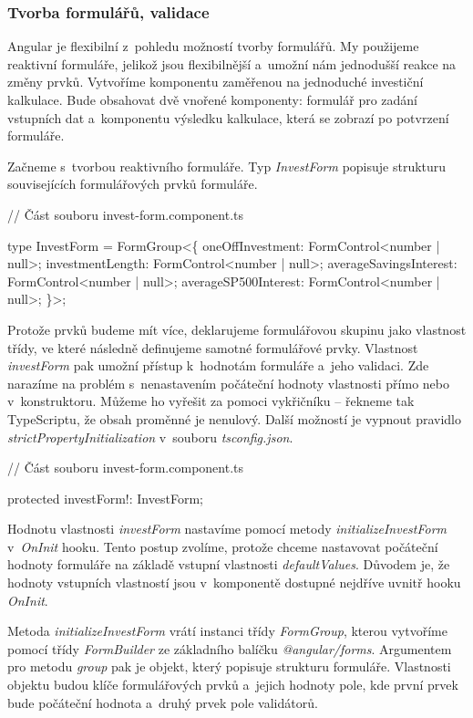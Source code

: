 \subsubsection*{Tvorba formulářů, validace}

Angular je flexibilní z~pohledu možností tvorby formulářů. My použijeme reaktivní formuláře, jelikož jsou flexibilnější a~umožní nám jednodušší reakce na změny prvků.
Vytvoříme komponentu zaměřenou na jednoduché investiční kalkulace. 
Bude obsahovat dvě vnořené komponenty: formulář pro zadání vstupních dat a~komponentu výsledku kalkulace, která se zobrazí po potvrzení formuláře.

Začneme s~tvorbou reaktivního formuláře. Typ \emph{InvestForm} popisuje strukturu souvisejících formulářových prvků formuláře.

\begin{prog}
// Část souboru invest-form.component.ts

type InvestForm = FormGroup<\{
  oneOffInvestment: FormControl<number | null>;
  investmentLength: FormControl<number | null>;
  averageSavingsInterest: FormControl<number | null>;
  averageSP500Interest: FormControl<number | null>;
\}>;
\end{prog}

Protože prvků budeme mít více, deklarujeme formulářovou skupinu jako vlastnost třídy, ve které následně definujeme samotné formulářové prvky. 
Vlastnost \emph{investForm} pak umožní přístup k~hodnotám formuláře a~jeho validaci. Zde narazíme na problém s~nenastavením počáteční hodnoty vlastnosti přímo nebo v~konstruktoru. 
Můžeme ho vyřešit za pomoci vykřičníku -- řekneme tak TypeScriptu, že obsah proměnné je nenulový. Další možností je vypnout pravidlo \emph{strictPropertyInitialization} v~souboru \emph{tsconfig.json}.

\begin{prog}
// Část souboru invest-form.component.ts

protected investForm!: InvestForm;
\end{prog}

Hodnotu vlastnosti \emph{investForm} nastavíme pomocí metody \emph{initializeInvestForm} v~\emph{OnInit} hooku. 
Tento postup zvolíme, protože chceme nastavovat počáteční hodnoty formuláře na základě vstupní vlastnosti \emph{defaultValues}.
Důvodem je, že hodnoty vstupních vlastností jsou v~komponentě dostupné nejdříve uvnitř hooku \emph{OnInit}.

Metoda \emph{initializeInvestForm} vrátí instanci třídy \emph{FormGroup}, kterou vytvoříme pomocí třídy \emph{FormBuilder} ze základního balíčku \emph{@angular/forms}. 
Argumentem pro metodu \emph{group} pak je objekt, který popisuje strukturu formuláře. 
Vlastnosti objektu budou klíče formulářových prvků a~jejich hodnoty pole, kde první prvek bude počáteční hodnota a~druhý prvek pole validátorů.

